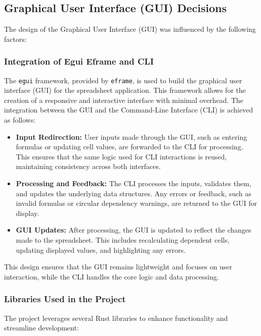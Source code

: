 \documentclass{article}
\begin{document}
\subsection{Graphical User Interface (GUI) Decisions}
The design of the Graphical User Interface (GUI) was influenced by the following factors:
\subsubsection{Integration of Egui Eframe and CLI}
The \texttt{egui} framework, provided by \texttt{eframe}, is used to build the graphical user interface (GUI) for the spreadsheet application. This framework allows for the creation of a responsive and interactive interface with minimal overhead. The integration between the GUI and the Command-Line Interface (CLI) is achieved as follows:

\begin{itemize}
    \item \textbf{Input Redirection:} User inputs made through the GUI, such as entering formulas or updating cell values, are forwarded to the CLI for processing. This ensures that the same logic used for CLI interactions is reused, maintaining consistency across both interfaces.
    \item \textbf{Processing and Feedback:} The CLI processes the inputs, validates them, and updates the underlying data structures. Any errors or feedback, such as invalid formulas or circular dependency warnings, are returned to the GUI for display.
    \item \textbf{GUI Updates:} After processing, the GUI is updated to reflect the changes made to the spreadsheet. This includes recalculating dependent cells, updating displayed values, and highlighting any errors.
\end{itemize}

This design ensures that the GUI remains lightweight and focuses on user interaction, while the CLI handles the core logic and data processing.

\subsubsection{Libraries Used in the Project}
The project leverages several Rust libraries to enhance functionality and streamline development:
\end{document}
